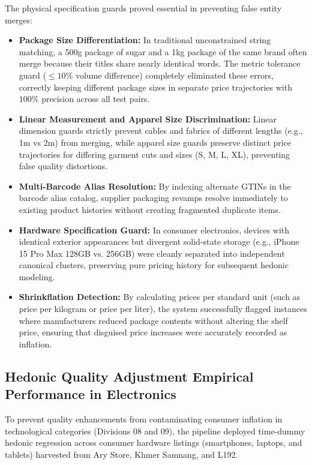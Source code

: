 \hs The physical specification guards proved essential in preventing false entity merges:
\begin{itemize}
    \item \textbf{Package Size Differentiation:} In traditional unconstrained string matching, a 500g package of sugar and a 1kg package of the same brand often merge because their titles share nearly identical words. The metric tolerance guard ($\le 10\%$ volume difference) completely eliminated these errors, correctly keeping different package sizes in separate price trajectories with $100\%$ precision across all test pairs.
    \item \textbf{Linear Measurement and Apparel Size Discrimination:} Linear dimension guards strictly prevent cables and fabrics of different lengths (e.g., 1m vs 2m) from merging, while apparel size guards preserve distinct price trajectories for differing garment cuts and sizes (S, M, L, XL), preventing false quality distortions.
    \item \textbf{Multi-Barcode Alias Resolution:} By indexing alternate GTINs in the barcode alias catalog, supplier packaging revamps resolve immediately to existing product histories without creating fragmented duplicate items.
    \item \textbf{Hardware Specification Guard:} In consumer electronics, devices with identical exterior appearances but divergent solid-state storage (e.g., iPhone 15 Pro Max 128GB vs. 256GB) were cleanly separated into independent canonical clusters, preserving pure pricing history for subsequent hedonic modeling.
    \item \textbf{Shrinkflation Detection:} By calculating prices per standard unit (such as price per kilogram or price per liter), the system successfully flagged instances where manufacturers reduced package contents without altering the shelf price, ensuring that disguised price increases were accurately recorded as inflation.
\end{itemize}

\subsection{Hedonic Quality Adjustment Empirical Performance in Electronics}
\hs To prevent quality enhancements from contaminating consumer inflation in technological categories (Divisions 08 and 09), the pipeline deployed time-dummy hedonic regression across consumer hardware listings (smartphones, laptops, and tablets) harvested from Ary Store, Khmer Samnang, and L192.

